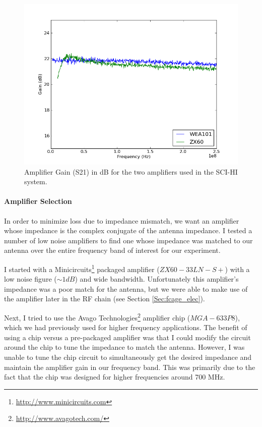 \begin{figure}[htb]
\begin{center}
\includegraphics[width=0.9\linewidth]{SCIHI_system/figures/amp_Gain_dB.png}
\caption{Amplifier Gain (S21) in dB for the two amplifiers used in the SCI-HI system. }
\label{Fig:amp_gain}
\end{center}
\end{figure}

\paragraph{Amplifier Selection}
In order to minimize loss due to impedance mismatch, we want an amplifier whose impedance is the complex conjugate of the antenna impedance. I tested a number of low noise amplifiers to find one whose impedance was matched to our antenna over the entire frequency band of interest for our experiment. 

I started with a Minicircuits\footnote{\url{http://www.minicircuits.com}} packaged amplifier ($ZX60 - 33 LN - S+$) with a low noise figure ($\sim 1 dB$) and wide bandwidth. Unfortunately this amplifier's impedance was a poor match for the antenna, but we were able to make use of the amplifier later in the RF chain (see Section \ref{Sec:fcage_elec}). 

Next, I tried to use the Avago Technologies\footnote{\url{http://www.avagotech.com/}} amplifier chip ($MGA-633P8$), which we had previously used for higher frequency applications. The benefit of using a chip versus a pre-packaged amplifier was that I could modify the circuit around the chip to tune the impedance to match the antenna. However, I was unable to tune the chip circuit to simultaneously get the desired impedance and maintain the amplifier gain in our frequency band. This was primarily due to the fact that the chip was designed for higher frequencies around 700 MHz. 

